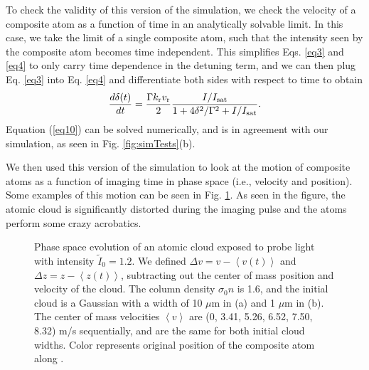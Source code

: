 To check the validity of this version of the simulation, we check the velocity of a composite atom as a function of time in an analytically solvable limit. In this case, we take the limit of a single composite atom, such that the intensity seen by the composite atom becomes time independent. This simplifies  Eqs. \ref{eq3} and \ref{eq4} to only carry time dependence in the detuning term, and we can then plug Eq. \ref{eq3} into Eq. \ref{eq4} and differentiate both sides with respect to time to obtain
%
\begin{equation}
\frac{d\delta(t)}{dt}= \frac{\Gamma k_{\rm{r}} v_{\rm{r}}}{2} \frac{I/I_{\rm{sat}}}{1+4\delta^2/\Gamma^2+I/I_{\rm{sat}}}.
\label{eq10}
\end{equation}
Equation (\ref{eq10}) can be solved numerically, and is in agreement with our simulation, as seen in Fig. \ref{fig:simTests}(b).


We then used this version of the simulation to look at the motion of composite atoms as a function of imaging time in phase space (i.e., velocity and position). Some examples of this motion can be seen in  Fig. \ref{fig:phaseSpace}. As seen in the figure, the atomic cloud is significantly distorted during the imaging pulse and the atoms perform some crazy acrobatics. 
\begin{figure}
\caption[Phase space evolution of the atomic cloud]{Phase space evolution of an atomic cloud exposed to probe light with intensity $\tilde{I}_0=1.2$. We defined $\Delta v=v -\left< v(t) \right>$  and $\Delta z=z-\left< z(t) \right>$, subtracting out the center of mass position and velocity of the cloud. The column density $\sigma_0 n$ is 1.6, and the initial cloud is a Gaussian with a width of 10 $\mu$m in (a) and 1 $\mu$m in (b). The center of mass velocities $\left< v\right>$ are (0,  3.41, 5.26, 6.52, 7.50, 8.32) m/s sequentially, and are the same for both initial cloud widths. Color represents original position of the composite atom along \ez{}. }
\label{fig:phaseSpace}
\end{figure}


